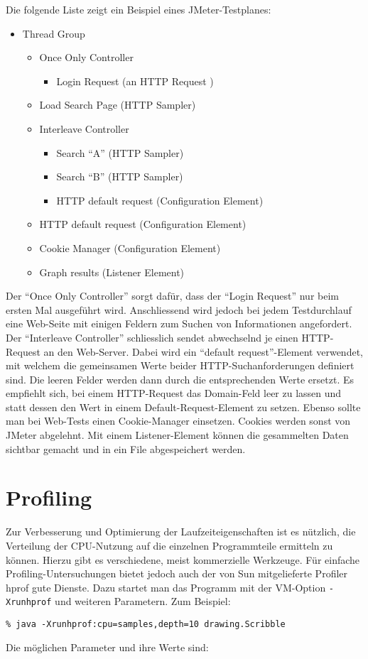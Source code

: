 \newslide
Die folgende Liste zeigt ein Beispiel eines JMeter-Testplanes:
\begin{itemize}
\item Thread Group
  \begin{itemize}
    \item Once Only Controller
      \begin{itemize}
        \item Login Request (an HTTP Request )
      \end{itemize}
      \item Load Search Page (HTTP Sampler)
      \item Interleave Controller
      \begin{itemize}
        \item Search ``A'' (HTTP Sampler)
        \item Search ``B'' (HTTP Sampler)
        \item HTTP default request (Configuration Element)
      \end{itemize}
      \item HTTP default request (Configuration Element)
      \item Cookie Manager (Configuration Element)
      \item Graph results (Listener Element)
  \end{itemize}
\end{itemize}
Der ``Once Only Controller'' sorgt dafür, dass der
``Login Request'' nur beim  ersten Mal ausgeführt wird. Anschliessend wird
jedoch bei jedem Testdurchlauf eine Web-Seite mit einigen Feldern zum Suchen
von Informationen angefordert. Der ``Interleave Controller'' schliesslich
sendet abwechselnd je einen HTTP-Request an den Web-Server. Dabei wird ein
``default request''-Element verwendet, mit welchem die gemeinsamen Werte beider
HTTP-Such\-an\-for\-der\-ungen definiert sind. Die leeren Felder werden dann durch die
entsprechenden Werte ersetzt. Es empfiehlt sich, bei einem HTTP-Request das
Domain-Feld leer zu lassen und statt dessen den Wert in einem
Default-Request-Element zu setzen. Ebenso sollte man bei Web-Tests einen
Cookie-Manager einsetzen. Cookies werden sonst von JMeter abgelehnt.
Mit einem Listener-Element können die gesammelten Daten sichtbar gemacht und
in ein File abgespeichert werden.
%
\newpage
\section{Profiling}
Zur Verbesserung und Optimierung der Laufzeiteigenschaften ist es nützlich, die
Verteilung der CPU-Nutzung auf die einzelnen Programmteile ermitteln zu
können. Hierzu gibt es verschiedene, meist kommerzielle Werkzeuge. Für einfache
Profiling-Untersuchungen bietet jedoch auch der von Sun mitgelieferte
Profiler hprof gute Dienste. Dazu startet man das Programm mit der
VM-Option \verb+-Xrunhprof+ und weiteren Parametern. Zum Beispiel:
\begin{lstlisting}
% java -Xrunhprof:cpu=samples,depth=10 drawing.Scribble
\end{lstlisting}
\newslide
Die möglichen Parameter und ihre Werte sind:

